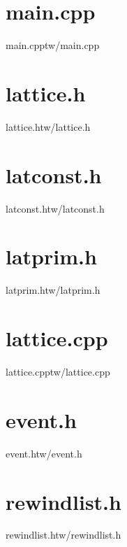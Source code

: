 
\section{main.cpp}
\begin{code}{main.cpp}{tw/main.cpp}

\end{code}

\section{lattice.h}
\begin{code}{lattice.h}{tw/lattice.h}

\end{code}

\section{latconst.h}
\begin{code}{latconst.h}{tw/latconst.h}

\end{code}

\section{latprim.h}
\begin{code}{latprim.h}{tw/latprim.h}

\end{code}

\section{lattice.cpp}
\begin{code}{lattice.cpp}{tw/lattice.cpp}

\end{code}

\section{event.h}
\begin{code}{event.h}{tw/event.h}

\end{code}

\section{rewindlist.h}
\begin{code}{rewindlist.h}{tw/rewindlist.h}

\end{code}

